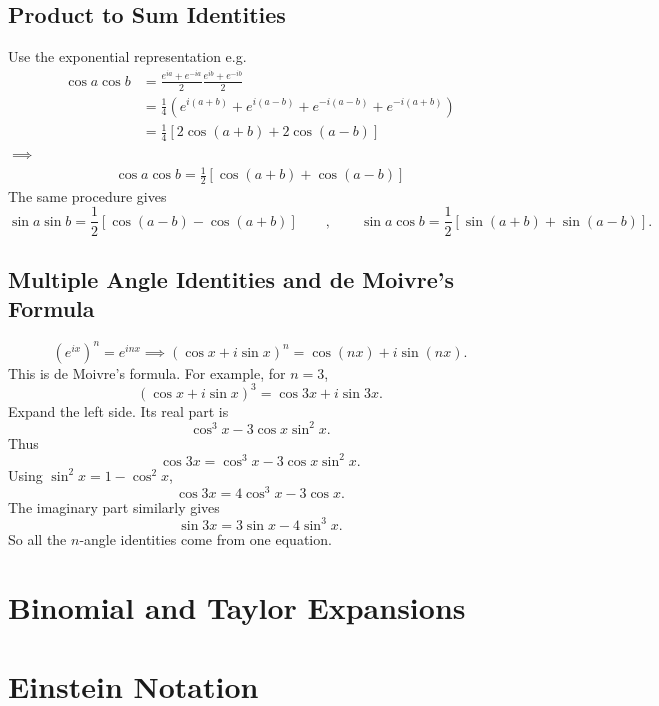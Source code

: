 \documentclass[11pt, answers]{exam}
\begin{document}
    \subsection{Product to Sum Identities}
    Use the exponential representation e.g.
    \begin{align*}
        \cos a\cos b &= \frac{e^{ia}+e^{-ia}}{2}\frac{e^{ib}+e^{-ib}}{2} \\
        &=\frac14
        \left(
        e^{i(a+b)}
        +e^{i(a-b)}
        +e^{-i(a-b)}
        +e^{-i(a+b)}
        \right) \\
        &=\frac14
        \left[
        2\cos(a+b)+2\cos(a-b)
        \right]
    \end{align*}
    $\implies$
    \begin{align*}
        \boxed{
        \cos a\cos b
        =
        \frac12[\cos(a+b)+\cos(a-b)]
        }
    \end{align*}
    The same procedure gives
    \[
    \boxed{
    \sin a\sin b
    =
    \frac12[\cos(a-b)-\cos(a+b)]
    }\qquad,\qquad
    \boxed{
    \sin a\cos b
    =
    \frac12[\sin(a+b)+\sin(a-b)]
    }.
    \]

    \subsection{Multiple Angle Identities and de Moivre's Formula}
    \[
    (e^{ix})^n=e^{inx} \implies
    \boxed{
    (\cos x+i\sin x)^n
    =
    \cos(nx)+i\sin(nx)
    }.
    \]This is de Moivre's formula.
    For example, for \(n=3\),
    \[
    (\cos x+i\sin x)^3
    =
    \cos3x+i\sin3x.
    \]Expand the left side. Its real part is
    \[
    \cos^3x-3\cos x\sin^2x.
    \]Thus
    \[
    \cos3x
    =
    \cos^3x-3\cos x\sin^2x.
    \]Using \(\sin^2x=1-\cos^2x\),
    \[
    {\cos3x=4\cos^3x-3\cos x}.
    \]The imaginary part similarly gives
    \[
    {\sin3x=3\sin x-4\sin^3x}.
    \]So all the \(n\)-angle identities come from one equation.
    
    \section{Binomial and Taylor Expansions}
    
    \section{Einstein Notation}
\end{document}
